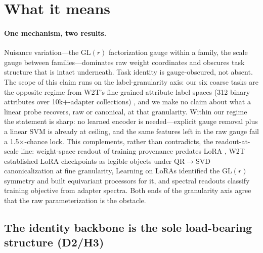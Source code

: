 \documentclass[10pt]{article}
\begin{document}
\section{What it means}
\label{sec:meaning}

\paragraph{One mechanism, two results.} Nuisance variation---the
$\mathrm{GL}(r)$ factorization gauge within a family, the scale gauge
between families---dominates raw weight coordinates and obscures task
structure that is intact underneath. Task identity is gauge-obscured, not
absent. The scope of this claim runs on the label-granularity axis: our six
coarse tasks are the opposite regime from W2T's fine-grained attribute
label spaces (312 binary attributes over 10k+-adapter collections)
\cite{w2t2026lora}, and we make no claim about what a linear probe
recovers, raw or canonical, at that granularity. Within our regime the
statement is sharp: no learned encoder is needed---explicit gauge removal
plus a linear SVM is already at ceiling, and the same features left in the
raw gauge fail a 1.5$\times$-chance lock. This complements, rather than
contradicts, the readout-at-scale line: weight-space readout of training
provenance predates LoRA \cite{eilertsen2020classify,unterthiner2020predict},
W2T \cite{w2t2026lora} established LoRA checkpoints as legible objects
under QR$\rightarrow$SVD canonicalization at fine granularity, Learning on
LoRAs \cite{putterman2024lol} identified the $\mathrm{GL}(r)$ symmetry and
built equivariant processors for it, and spectral readouts
\cite{paul2026spectral} classify training objective from adapter spectra.
Both ends of the granularity axis agree that the raw parameterization is
the obstacle.

\subsection{The identity backbone is the sole load-bearing structure (D2/H3)}
\label{sec:d2}
\end{document}
